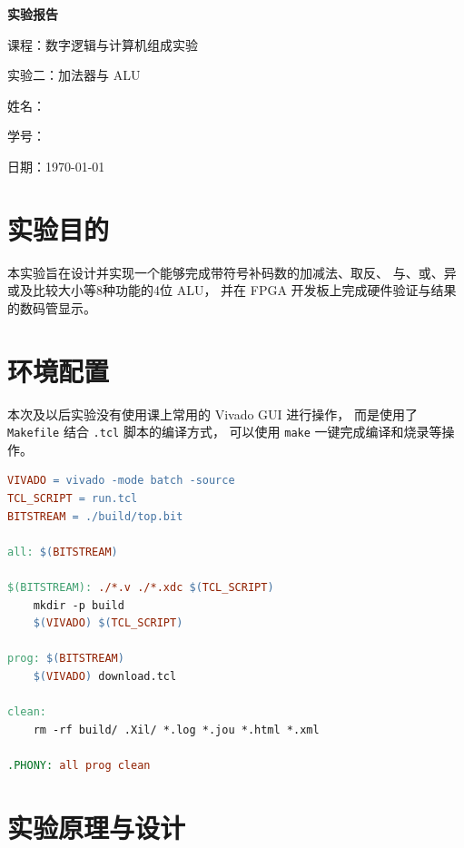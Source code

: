 \documentclass[12pt, a4paper]{ctexart}
\begin{document}
\begin{titlepage}
    \centering
    \vspace*{5cm}
    {\Huge\bfseries 实验报告\par}
    \vspace{2cm}
    {\Large 课程：数字逻辑与计算机组成实验\par}
    \vspace{1cm}
    {\Large 实验二：加法器与 ALU\par}
    \vspace{4cm}
    {\large 姓名：\underline{}\par}
    \vspace{1cm}
    {\large 学号：\underline{}\par}
    \vspace{1cm}
    {\large 日期：\today\par}
\end{titlepage}

\tableofcontents
\newpage

\section{实验目的}
本实验旨在设计并实现一个能够完成带符号补码数的加减法、取反、
与、或、异或及比较大小等8种功能的4位 ALU，
并在 FPGA 开发板上完成硬件验证与结果的数码管显示。

\section{环境配置}
本次及以后实验没有使用课上常用的 Vivado GUI 进行操作，
而是使用了 \texttt{Makefile} 结合 \texttt{.tcl} 脚本的编译方式，
可以使用 \texttt{make} 一键完成编译和烧录等操作。

\begin{lstlisting}[language=make]
VIVADO = vivado -mode batch -source
TCL_SCRIPT = run.tcl
BITSTREAM = ./build/top.bit

all: $(BITSTREAM)

$(BITSTREAM): ./*.v ./*.xdc $(TCL_SCRIPT)
    mkdir -p build
    $(VIVADO) $(TCL_SCRIPT)

prog: $(BITSTREAM)
    $(VIVADO) download.tcl

clean:
    rm -rf build/ .Xil/ *.log *.jou *.html *.xml 

.PHONY: all prog clean
\end{lstlisting}

\section{实验原理与设计}
\end{document}
